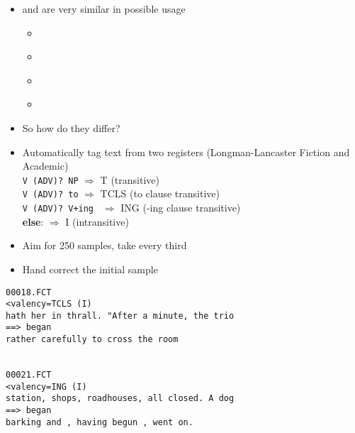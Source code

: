 \documentclass[a4paper,landscape,headrule,footrule,dvips]{foils}
\begin{document}
\begin{CJK}{UTF8}{min}
\MyLogo{}

\begin{itemize}
\item {} and  are very similar in possible usage
  \begin{itemize}
  \item {}
    \\ 
  \item {}
    \\ 
  \item {}
    \\ 
  \item {}
    \\ 
  \end{itemize}
\item So how do they differ?
\end{itemize}

\MyLogo{}
\begin{itemize}
\item Automatically tag text from two registers 
(Longman-Lancaster Fiction and Academic)
\\ \texttt{V (ADV)? NP} $\Rightarrow$ T (transitive) 
\\ \texttt{V (ADV)? to} $\Rightarrow$ TCLS (to clause transitive)
\\ \texttt{V (ADV)? V+ing } $\Rightarrow$ ING (-ing clause transitive)
\\ \textbf{else}: $\Rightarrow$ I (intransitive)
\item Aim for 250 samples, take every third 
\item Hand correct the initial sample
\end{itemize}


\begin{verbatim}
00018.FCT
<valency=TCLS (I)
hath her in thrall. "After a minute, the trio
==> began
rather carefully to cross the room


00021.FCT
<valency=ING (I)
station, shops, roadhouses, all closed. A dog
==> began
barking and , having begun , went on.
\end{verbatim}



\end{CJK}
\end{document}
